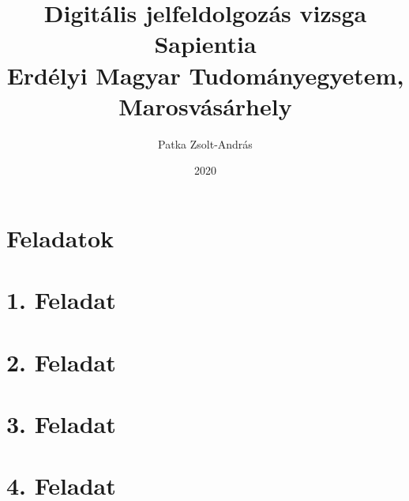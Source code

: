 \documentclass[12pt]{article}
\title{
	{Digitális jelfeldolgozás vizsga}\\
	{\large Sapientia\\
	Erdélyi Magyar Tudományegyetem, Marosvásárhely}
}
\author{Patka Zsolt-András}
\date{2020}
\begin{document}
\maketitle
{}

\tableofcontents
\listoffigures

\section{Feladatok}


\section{1. Feladat}


\section{2. Feladat}


\section{3. Feladat}


\section{4. Feladat}


\appendix

\end{document}
